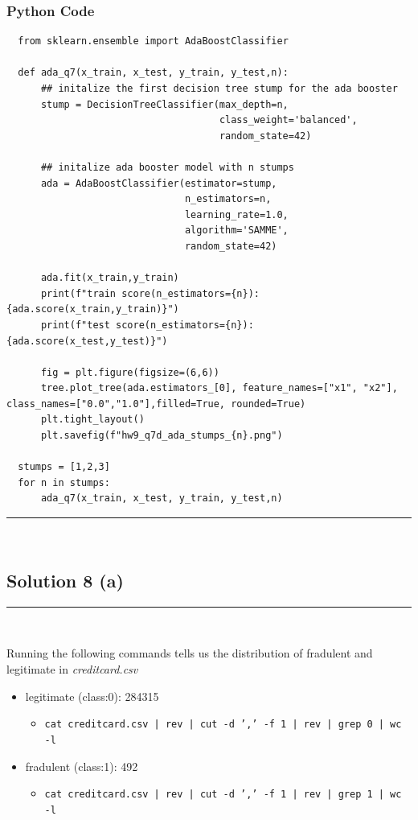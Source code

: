 \documentclass{article}
\begin{document}
\subsubsection*{Python Code}
\begin{lstlisting}
  from sklearn.ensemble import AdaBoostClassifier

  def ada_q7(x_train, x_test, y_train, y_test,n):
      ## initalize the first decision tree stump for the ada booster
      stump = DecisionTreeClassifier(max_depth=n,
                                     class_weight='balanced',
                                     random_state=42)
  
      ## initalize ada booster model with n stumps
      ada = AdaBoostClassifier(estimator=stump,
                               n_estimators=n,
                               learning_rate=1.0,
                               algorithm='SAMME',
                               random_state=42)
  
      ada.fit(x_train,y_train)
      print(f"train score(n_estimators={n}): {ada.score(x_train,y_train)}")
      print(f"test score(n_estimators={n}): {ada.score(x_test,y_test)}")
  
      fig = plt.figure(figsize=(6,6))
      tree.plot_tree(ada.estimators_[0], feature_names=["x1", "x2"], class_names=["0.0","1.0"],filled=True, rounded=True)
      plt.tight_layout()
      plt.savefig(f"hw9_q7d_ada_stumps_{n}.png")
  
  stumps = [1,2,3]
  for n in stumps:
      ada_q7(x_train, x_test, y_train, y_test,n)  
\end{lstlisting}

\noindent\rule{\textwidth}{0.4pt}\\

\newpage

\subsection*{Solution 8 (a)}
\noindent\rule{\textwidth}{0.4pt}\\
\parbox{\textwidth}{Running the following commands tells us the distribution of fradulent and legitimate in \textit{creditcard.csv}}
\begin{itemize}
  \item legitimate (class:0): 284315
  \begin{itemize}
    \item \texttt{cat creditcard.csv | rev | cut -d ',' -f 1 | rev | grep 0 | wc -l}
  \end{itemize}
  \item fradulent (class:1): 492
  \begin{itemize}
    \item \texttt{cat creditcard.csv | rev | cut -d ',' -f 1 | rev | grep 1 | wc -l}
  \end{itemize}
\end{itemize}
\end{document}
